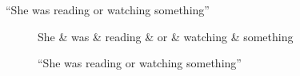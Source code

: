 \documentclass[11pt,a4paper]{article}
\begin{document}
``She was reading or watching something''

\begin{figure}[h]
    \centering
    \begin{dependency}
    \begin{deptext}[column sep=1em]
    She \& was \& reading \& or \& watching \& something  \\
    \end{deptext}
    \end{dependency}
    \caption{``She was reading or watching something''}
\end{figure}
    
\end{document}
